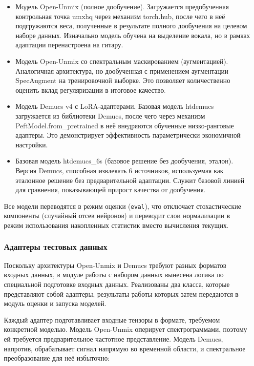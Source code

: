 \documentclass[14pt]{extarticle}
\begin{document}
\begin{itemize}[label=$\bullet$, wide]
    \item Модель Open-Unmix (полное дообучение). Загружается предобученная контрольная точка umxhq через 
	механизм torch.hub, после чего в неё подгружаются веса, полученные в результате полного дообучения на 
	целевом наборе данных. Изначально модель обучена на выделение вокала, но в рамках адаптации перенастроена на гитару.
    \item Модель Open-Unmix со спектральным маскированием (аугментацией). Аналогичная архитектура, но дообученная с применением 
	аугментации SpecAugment на тренировочной выборке. Это позволяет количественно оценить вклад регуляризации в 
	итоговое качество.
    \item Модель Demucs v4 с LoRA-адаптерами. Базовая модель htdemucs загружается из библиотеки Demucs,
	 после чего через механизм PeftModel.from\_pretrained в неё внедряются обученные низко-ранговые адаптеры.
	 Это демонстрирует эффективность параметрически экономичной настройки.
    \item Базовая модель htdemucs\_6s (базовое решение без дообучения, эталон). Версия Demucs, способная извлекать 6 источников,
	используемая как эталонное решение без предварительной адаптации. Служит базовой линией для сравнения, показывающей 
	прирост качества от дообучения.
\end{itemize}

Все модели переводятся в режим оценки (\texttt{eval}), что отключает стохастические компоненты (случайный отсев нейронов) 
и переводит слои нормализации в режим использования накопленных статистик вместо вычисления текущих.

\subsubsection{Адаптеры тестовых данных}
Поскольку архитектуры Open-Unmix и Demucs требуют разных форматов входных данных, в модуле работы 
с набором данных вынесена логика по специальной подготовке входных данных.
Реализованы два класса, которые представляют собой адаптеры, результаты работы которых затем передаются в модуль оценки и запуска моделей.

Каждый адаптер подготавливает входные тензоры в формате, требуемом конкретной моделью. Модель Open-Unmix оперирует 
спектрограммами, поэтому ей требуется предварительное частотное представление. 
Модель Demucs, напротив, обрабатывает сигнал напрямую во временной области, и спектральное преобразование для неё избыточно:
\end{document}
